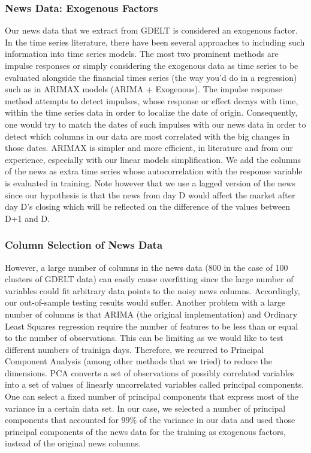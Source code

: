 \subsubsection{News Data: Exogenous Factors}
Our news data that we extract from GDELT is considered an exogenous factor. In the time series literature, there have been several approaches to including such information into time series models. The most two prominent methods are impulse responses or simply considering the exogenous data as time series to be evaluated alongside the financial times series (the way you'd do in a regression) such as in ARIMAX models (ARIMA + Exogenous).
The impulse response method attempts to detect impulses, whose response or effect decays with time,  within the time series data in order to localize the date of origin. Consequently, one would try to match the dates of such impulses with our news data in order to detect which columns in our data are most correlated with the big changes in those dates.
ARIMAX is simpler and more efficient, in literature and from our experience, especially with our linear models simplification. We add the columns of the news as extra time series whose autocorrelation with the response variable is evaluated in training. Note however that we use a lagged version of the news since our hypothesis is that the news from day D would affect the market after day D's closing which will be reflected on the difference of the values between D+1 and D.
\subsubsection{Column Selection of News Data}
However, a large number of columns in the news data (800 in the case of 100 clusters of GDELT data) can easily cause overfitting since the large number of variables could fit arbitrary data points to the noisy news columns. Accordingly, our out-of-sample testing results would suffer.
Another problem with a large number of columns is that ARIMA (the original implementation) and Ordinary Least Squares regression require the number of features to be less than or equal to the number of observations. This can be limiting as we would like to test different numbers of trainign days. Therefore, we recurred to Principal Component Analysis (among other methods that we tried) to reduce the dimensions. PCA converts a set of observations of possibly correlated variables into a set of values of linearly uncorrelated variables called principal components.\cite{PCA} One can select a fixed number of principal components that express most of the variance in a certain data set. In our case, we selected a number of principal components that accounted for $99\%$ of the variance in our data and used those principal components of the news data for the training as exogenous factors, instead of the original news columns.
